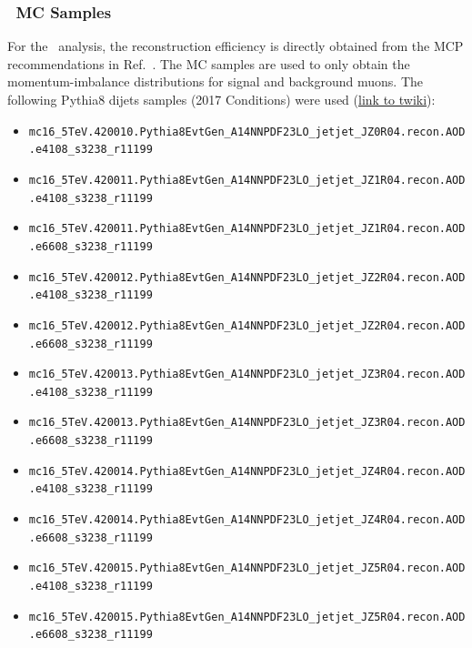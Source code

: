 \subsubsection{\pp\ MC Samples}
For the \pp\ analysis, the reconstruction efficiency is directly 
  obtained from the MCP recommendations in Ref.~\cite{Rel21Uncertainties}.
The MC samples are used to only obtain the momentum-imbalance 
  distributions for signal and background muons.
The following Pythia8 dijets samples (2017 Conditions) were used 
  (\href{https://twiki.cern.ch/twiki/bin/viewauth/AtlasProtected/HIJetMCSamples#Pythia8_dijets_8M_per_sample_in}{link to twiki}): 
\begin{itemize}
  \item {\small \verb=mc16_5TeV.420010.Pythia8EvtGen_A14NNPDF23LO_jetjet_JZ0R04.recon.AOD.e4108_s3238_r11199=}
  \item {\small \verb=mc16_5TeV.420011.Pythia8EvtGen_A14NNPDF23LO_jetjet_JZ1R04.recon.AOD.e4108_s3238_r11199=}
  \item {\small \verb=mc16_5TeV.420011.Pythia8EvtGen_A14NNPDF23LO_jetjet_JZ1R04.recon.AOD.e6608_s3238_r11199=}
  \item {\small \verb=mc16_5TeV.420012.Pythia8EvtGen_A14NNPDF23LO_jetjet_JZ2R04.recon.AOD.e4108_s3238_r11199=}
  \item {\small \verb=mc16_5TeV.420012.Pythia8EvtGen_A14NNPDF23LO_jetjet_JZ2R04.recon.AOD.e6608_s3238_r11199=}
  \item {\small \verb=mc16_5TeV.420013.Pythia8EvtGen_A14NNPDF23LO_jetjet_JZ3R04.recon.AOD.e4108_s3238_r11199=}
  \item {\small \verb=mc16_5TeV.420013.Pythia8EvtGen_A14NNPDF23LO_jetjet_JZ3R04.recon.AOD.e6608_s3238_r11199=}
  \item {\small \verb=mc16_5TeV.420014.Pythia8EvtGen_A14NNPDF23LO_jetjet_JZ4R04.recon.AOD.e4108_s3238_r11199=}
  \item {\small \verb=mc16_5TeV.420014.Pythia8EvtGen_A14NNPDF23LO_jetjet_JZ4R04.recon.AOD.e6608_s3238_r11199=}
  \item {\small \verb=mc16_5TeV.420015.Pythia8EvtGen_A14NNPDF23LO_jetjet_JZ5R04.recon.AOD.e4108_s3238_r11199=}
  \item {\small \verb=mc16_5TeV.420015.Pythia8EvtGen_A14NNPDF23LO_jetjet_JZ5R04.recon.AOD.e6608_s3238_r11199=}
\end{itemize}
